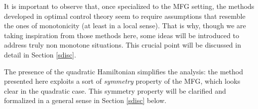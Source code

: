 \documentclass[10pt,a4paper,nouppercase,nowrite]{article}
\numberwithin{equation}{section}
\theoremstyle{definition}
\begin{document}
	It is important to observe that, once specialized to the MFG setting, the methods developed in optimal control theory seem to require assumptions that resemble the ones of monotonicity (at least in a local sense). That is why, though we are taking inspiration from those methods here, some ideas will be introduced to address truly non monotone situations. This crucial point will be discussed in detail in Section \ref{sdisc}.
		
	The presence of the quadratic Hamiltonian simplifies the analysis: the method presented here exploits a sort of \textit{symmetry} property of the MFG, which looks clear in the quadratic case. This symmetry property will be clarified and formalized in a general sense in Section \ref{sdisc} below.
		
	\medskip
\end{document}
